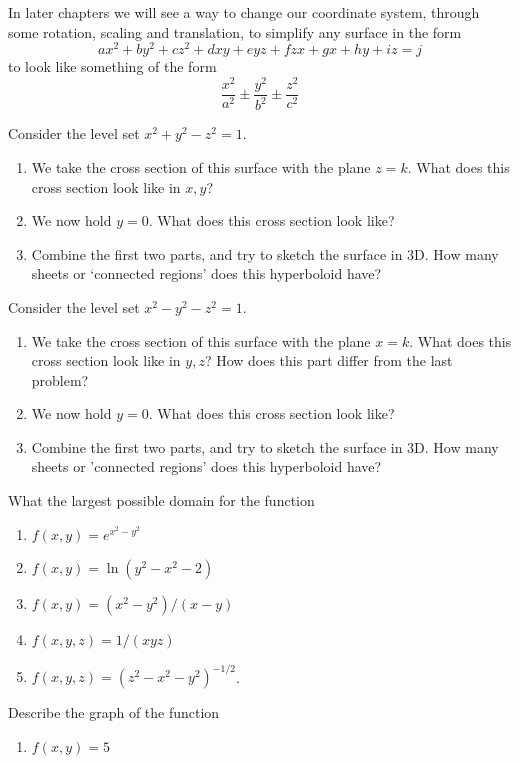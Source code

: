 In later chapters we will see a way to change our coordinate system, through some rotation, scaling and translation, to simplify any surface in the form \[
    ax^2+by^2+cz^2+dxy+eyz+fzx+gx+hy+iz=j
\] to look like something of the form \[
    \frac{x^2}{a^2}\pm\frac{y^2}{b^2}\pm\frac{z^2}{c^2}
\]
\exercises
\begin{exerciselist}
    \item Consider the level set $x^2+y^2-z^2=1$. \begin{enumerate}[label=(\alph*)]
        \item We take the cross section of this surface with the plane $z=k$. What does this cross section look like in $x,y$?
        \item We now hold $y=0$. What does this cross section look like?
        \item Combine the first two parts, and try to sketch the surface in 3D. How many sheets or `connected regions' does this hyperboloid have?
    \end{enumerate}
    \item Consider the level set $x^2-y^2-z^2=1$. \begin{enumerate}[label=(\alph*)]
        \item We take the cross section of this surface with the plane $x=k$. What does this cross section look like in $y,z$? How does this part differ from the last problem?
        \item We now hold $y=0$. What does this cross section look like?
        \item Combine the first two parts, and try to sketch the surface in 3D. How many sheets or 'connected regions' does this hyperboloid have?
    \end{enumerate}
    \item What the largest possible domain for the function \begin{enumerate}[label=(\alph*)]
        \item $f(x,y)=e^{x^2-y^2}$
        \item $f(x,y)=\ln (y^2-x^2-2)$
        \item $f(x,y)=(x^2-y^2)/(x-y)$
        \item $f(x,y,z)=1/(xyz)$
        \item $f(x,y,z)=(z^2-x^2-y^2)^{-1/2}$.
    \end{enumerate}
    \item Describe the graph of the function \begin{enumerate}[label=(\alph*)]
        \item $f(x,y)=5$

\end{enumerate}
\end{exerciselist}
